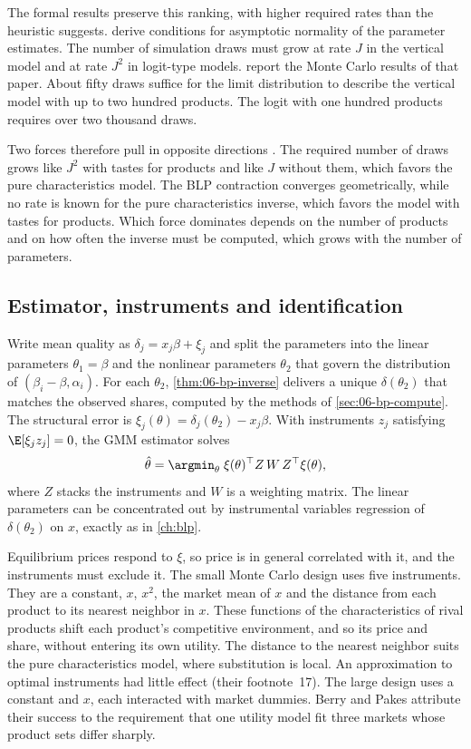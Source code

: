 The formal results preserve this ranking, with higher required rates than the heuristic suggests.
\citet{BerryLintonPakes2004} derive conditions for asymptotic normality of the parameter estimates. The number of
simulation draws must grow at rate $J$ in the vertical model and at rate $J^2$ in logit-type models.
\citet[p.~23]{BerryPakes2007} report the Monte Carlo results of that paper. About fifty draws suffice for the limit
distribution to describe the vertical model with up to two hundred products. The logit with one
hundred products requires over two thousand draws.

Two forces therefore pull in opposite directions \citep[pp.~23--24]{BerryPakes2007}. The required number of draws grows
like $J^2$ with tastes for products and like $J$ without them, which favors the pure characteristics model. The BLP
contraction converges geometrically, while no rate is known for the pure characteristics inverse, which favors the
model with tastes for products. Which force dominates depends on the number of products and on how often the inverse
must be computed, which grows with the number of parameters.

\subsection{Estimator, instruments and identification}\label{sec:06-bp-estimator}

Write mean quality as $\delta_j = x_j\beta + \xi_j$ and split the parameters into the linear parameters $\theta_1 = \beta$
and the nonlinear parameters $\theta_2$ that govern the distribution of $(\beta_i - \beta, \alpha_i)$. For each $\theta_2$,
\cref{thm:06-bp-inverse} delivers a unique $\delta(\theta_2)$ that matches the observed shares, computed by the methods of
\cref{sec:06-bp-compute}. The structural error is $\xi_j(\theta) = \delta_j(\theta_2) - x_j\beta$. With instruments $z_j$
satisfying $\E[\xi_j z_j] = 0$, the GMM estimator solves
\begin{equation}\label{eq:06-bp-gmm}
  \hat\theta = \argmin_{\theta} \; \xi(\theta)^\top Z\, W\, Z^\top \xi(\theta),
\end{equation}
where $Z$ stacks the instruments and $W$ is a weighting matrix. The linear parameters can be concentrated out by
instrumental variables regression of $\delta(\theta_2)$ on $x$, exactly as in \cref{ch:blp}.

Equilibrium prices respond to $\xi$, so price is in general correlated with it, and the instruments must exclude it. The small Monte Carlo design
uses five instruments. They are a constant, $x$, $x^2$, the market mean of $x$ and the distance from each product to its
nearest neighbor in $x$. These functions of the characteristics of rival products shift each product's competitive
environment, and so its price and share, without entering its own utility. The distance to the nearest neighbor suits
the pure characteristics model, where substitution is local. An approximation to optimal instruments had little effect
(their footnote~17). The large design uses a constant and $x$, each interacted with market dummies. Berry and Pakes
attribute their success to the requirement that one utility model fit three markets whose product sets differ sharply.


